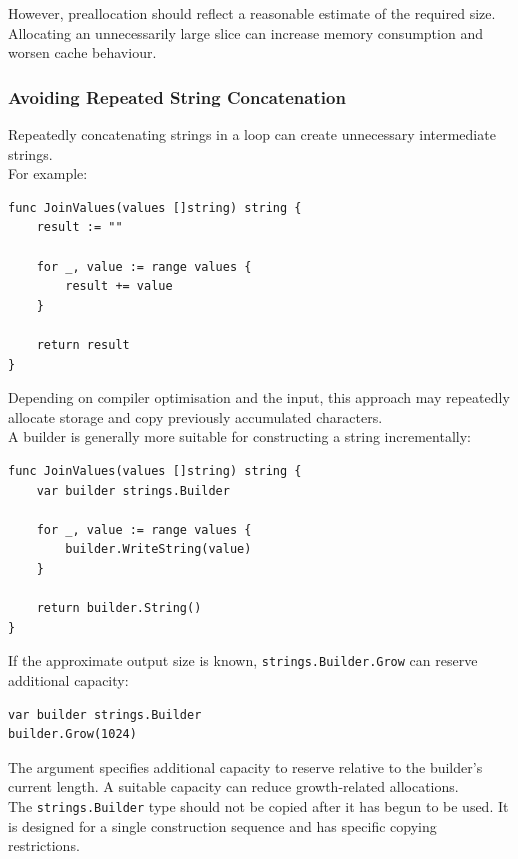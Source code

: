 However, preallocation should reflect a reasonable estimate of the required size. Allocating an unnecessarily large slice can increase memory consumption and worsen cache behaviour.

\subsubsection{Avoiding Repeated String Concatenation}

Repeatedly concatenating strings in a loop can create unnecessary intermediate strings.\\

For example:

\begin{lstlisting}
func JoinValues(values []string) string {
    result := ""

    for _, value := range values {
        result += value
    }

    return result
}
\end{lstlisting}

Depending on compiler optimisation and the input, this approach may repeatedly allocate storage and copy previously accumulated characters.\\

A builder is generally more suitable for constructing a string incrementally:

\begin{lstlisting}
func JoinValues(values []string) string {
    var builder strings.Builder

    for _, value := range values {
        builder.WriteString(value)
    }

    return builder.String()
}
\end{lstlisting}

If the approximate output size is known, \texttt{strings.Builder.Grow} can reserve additional capacity:

\begin{lstlisting}
var builder strings.Builder
builder.Grow(1024)
\end{lstlisting}

The argument specifies additional capacity to reserve relative to the builder's current length. A suitable capacity can reduce growth-related allocations.\\

The \texttt{strings.Builder} type should not be copied after it has begun to be used. It is designed for a single construction sequence and has specific copying restrictions.


